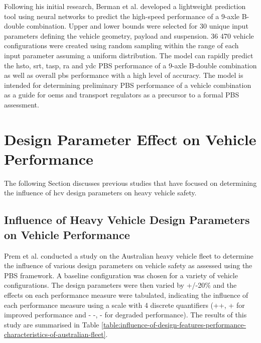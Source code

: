 Following his initial research, Berman et al. \cite{Berman2016} developed a lightweight prediction tool using neural networks to predict the high-speed performance of a 9-axle B-double combination. Upper and lower bounds were selected for 30 unique input parameters defining the vehicle geometry, payload and suspension. 36 470 vehicle configurations were created using random sampling within the range of each input parameter assuming a uniform distribution. The model can rapidly predict the \gls{hsto}, \gls{srt}, \gls{tasp}, \gls{ra} and \gls{ydc} PBS performance of a 9-axle B-double combination as well as overall \gls{pbs} performance with a high level of accuracy. The model is intended for determining preliminary PBS performance of a vehicle combination as a guide for \glspl{oem} and transport regulators as a precursor to a formal PBS assessment.

\section{Design Parameter Effect on Vehicle Performance}\label{section:design-parameter-effect-on-vehicle-performance}
The following Section discusses previous studies that have focused on determining the influence of \gls{hcv} design parameters on heavy vehicle safety.

\subsection{Influence of Heavy Vehicle Design Parameters on Vehicle Performance}\label{section:australian-study-on-the-influence-of-heavy-vehicle-design-parameters}

Prem et al. \cite{Prem2002} conducted a study on the Australian heavy vehicle fleet to determine the influence of various design parameters on vehicle safety as assessed using the PBS framework. A baseline configuration was chosen for a variety of vehicle configurations. The design parameters were then varied by +/-20\% and the effects on each performance measure were tabulated, indicating the influence of each performance measure using a scale with 4 discrete quantifiers (++, + for improved performance and - -, - for degraded performance). The results of this study are summarised in Table \ref{table:influence-of-design-features-performance-characteristics-of-australian-fleet}.

